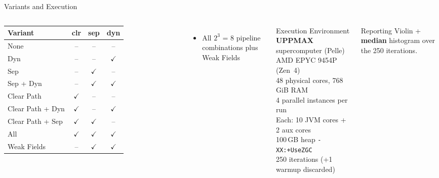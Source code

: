 \documentclass[aspectratio=169]{beamer}
\begin{document}
\begin{frame}{Variants and Execution}
    \begin{columns}[T]
        \small
        \begin{tabular}{lccc}
            \toprule
            \textbf{Variant} & \textbf{clr} & \textbf{sep} & \textbf{dyn} \\
            \midrule
            None              & -- & -- & -- \\
            Dyn         & -- & -- & $\checkmark$ \\
            Sep         & -- & $\checkmark$ & -- \\
            Sep + Dyn          & -- & $\checkmark$ & $\checkmark$ \\
            Clear Path & $\checkmark$ & -- & -- \\
            Clear Path + Dyn  & $\checkmark$ & -- & $\checkmark$ \\
            Clear Path + Sep  & $\checkmark$ & $\checkmark$ & -- \\
            All               & $\checkmark$ & $\checkmark$ & $\checkmark$ \\
            \midrule
            Weak Fields      & -- & $\checkmark$ & $\checkmark$ \\
            \bottomrule
        \end{tabular}
        \vspace{0.2em}
        \begin{itemize}
            \small\item All $2^3$ = 8 pipeline combinations plus Weak Fields
        \end{itemize}

        \begin{block}{Execution Environment}
            \small
            \textbf{UPPMAX} supercomputer (Pelle)\\[3pt]
            AMD EPYC 9454P (Zen~4)\\
            48 physical cores, 768\,GiB RAM\\[4pt]
            4 parallel instances per run\\
            Each: 10 JVM cores + 2 aux cores\\[4pt]
            100\,GB heap \quad \texttt{-XX:+UseZGC}\\
            250 iterations (+1 warmup discarded)
        \end{block}
        \vspace{0.3em}
        \begin{block}{\small Reporting}
            \small
            Violin + \textbf{median} histogram over the 250 iterations.
        \end{block}
    \end{columns}
\end{frame}
\end{document}
